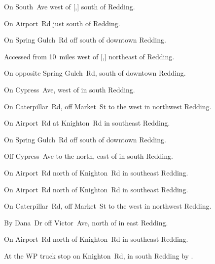 
\begin{LocationList}

On South~Ave west of [,] south of Redding.

On  Airport~Rd just south of Redding.

On Spring Gulch~Rd off  south of downtown Redding.

Accessed from  10~miles west of [,] northeast of Redding.

On  opposite Spring Gulch~Rd, south of downtown Redding.

On Cypress~Ave, west of  in south Redding.

On Caterpillar~Rd, off  Market~St to the west in northwest Redding.

\Location{\GarageHQ \Garage}
On Airport~Rd at Knighton~Rd in southeast Redding.

On Spring Gulch~Rd off  south of downtown Redding.

Off Cypress~Ave to the north, east of  in south Redding.

\Location{\RecruitmentAgency \Recruitment}
On Airport~Rd north of Knighton~Rd in southeast Redding.

On Airport~Rd north of Knighton~Rd in southeast Redding.

On Caterpillar~Rd, off  Market~St to the west in northwest Redding.

By Dana~Dr off Victor~Ave, north of  in east Redding.

On Airport~Rd north of Knighton~Rd in southeast Redding.

At the WP truck stop on Knighton~Rd, in south Redding by .

\end{LocationList}
